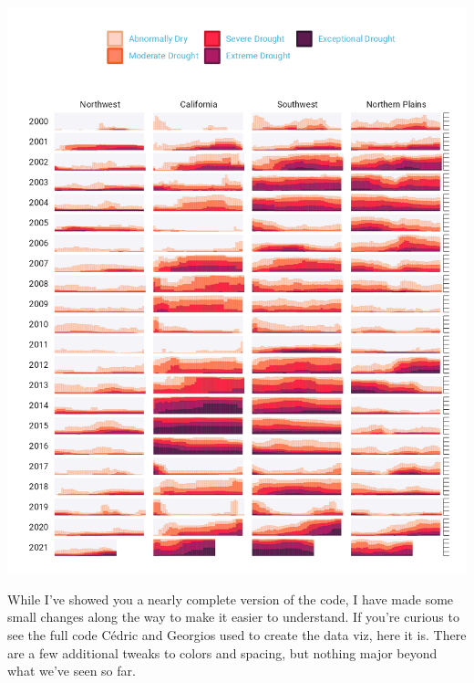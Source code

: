 \documentclass[
]{book}
\begin{document}
\includegraphics[width=1\linewidth]{data-viz_files/figure-latex/unnamed-chunk-48-1}

While I've showed you a nearly complete version of the code, I have made some small changes along the way to make it easier to understand. If you're curious to see the full code Cédric and Georgios used to create the data viz, here it is. There are a few additional tweaks to colors and spacing, but nothing major beyond what we've seen so far.
\end{document}
